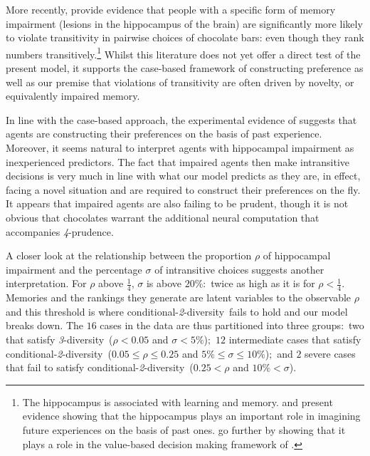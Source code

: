 \documentclass[12pt,a4paper,twoside]{article}
\newcommand{\fourpru}{\textit{4}-\textup{prudence}}
\newcommand{\condtwodiv}{\textup{conditional-\textit{2}-diversity}}
\newcommand{\threediv}{\textit{3}-\textup{diversity}}
\begin{document}
More recently, \citet{Enkavi-Hippocampal_dependence} provide evidence that
people with a specific form of memory impairment (lesions in the hippocampus of
the brain)
are significantly more likely to violate transitivity in pairwise choices of
chocolate bars: even though they rank numbers transitively.\footnote{The
  hippocampus is associated with learning and
  memory.  and
  \citet{Schacter-Hippocampal_dependence} present evidence showing that the
  hippocampus plays an important role in imagining future experiences on the
  basis of past ones.  go further by
  showing that it plays a role in the value-based decision making framework of
  \citet{Rangel-Value-based_neurobiology}.} Whilst this literature does not yet
offer a direct test of the present model, it supports the case-based framework
of constructing preference as well as our premise that violations of
transitivity are often driven by novelty, or equivalently impaired memory.

In line with the case-based approach, the experimental evidence of
\citet{Enkavi-Hippocampal_dependence} suggests that agents are constructing
their preferences on the basis of past experience. Moreover, it seems natural to
interpret agents with hippocampal impairment as inexperienced predictors. The
fact that impaired agents then make intransitive decisions is very much in line
with what our model predicts as they are, in effect, facing a novel situation
and are required to construct their preferences on the fly. It appears that
impaired agents are also failing to be prudent, though it is not obvious that
chocolates warrant the additional neural computation that accompanies \fourpru.
\begin{remark*}
  A closer look at the relationship between the proportion $\rho$ of hippocampal
  impairment and the percentage $\sigma$ of intransitive choices \citep[in
  figure 2 of][]{Enkavi-Hippocampal_dependence} suggests another interpretation.
  For $\rho $ above $ \frac{1}{4}$, $\sigma $ is above $ 20\%$$:$ twice as high as
  it is for $\rho < \frac{1}{4}$. Memories and the rankings they generate are
  latent variables to the observable $\rho$ and this threshold is where
  \condtwodiv\ fails to hold and our model breaks down. The $16$ cases in the
  data are thus partitioned into three groups$:$ two that satisfy \threediv\
  ($\rho < 0.05 $ and $\sigma< 5\%$)$;$ $12$ intermediate cases that satisfy
  \condtwodiv\ ($0.05 \leq \rho \leq 0.25 $ and $5\%\leq \sigma \leq 10\%$)$;$ and
  $2$ severe cases that fail to satisfy \condtwodiv\ ($0.25 < \rho$ and
  $10\% < \sigma$).
\end{remark*}
\end{document}
